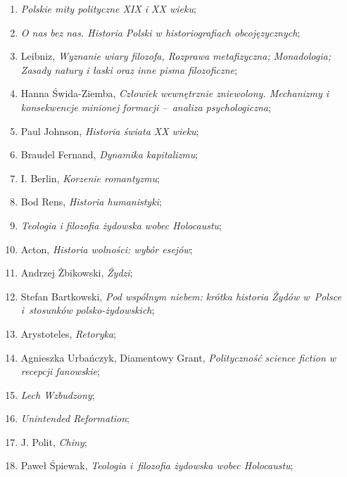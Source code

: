 \documentclass[a4paper,11pt]{article}
\begin{document}
\begin{enumerate}
\item \textit{Polskie mity polityczne XIX i XX wieku};

\item \textit{O nas bez nas. Historia Polski w historiografiach
    obcojęzycznych};

\item Leibniz, \textit{Wyznanie wiary filozofa, Rozprawa metafizyczna;
    Monadologia; Zasady natury i łaski oraz inne pisma filozoficzne};

\item Hanna Świda-Ziemba, \textit{Człowiek wewnętrznie zniewolony.
    Mechanizmy i konsekwencje minionej formacji --~analiza
    psychologiczna};

\item Paul Johnson, \textit{Historia świata XX wieku};

\item Braudel Fernand, \textit{Dynamika kapitalizmu};

\item I. Berlin, \textit{Korzenie romantyzmu};

\item Bod Rens, \textit{Historia humanistyki};

\item \textit{Teologia i filozofia żydowska wobec Holocaustu};

\item Acton, \textit{Historia wolności: wybór esejów};

\item Andrzej Żbikowski, \textit{Żydzi};

\item Stefan Bartkowski, \textit{Pod wspólnym niebem: krótka historia
    Żydów w~Polsce i~stosunków polsko-żydowskich};

\item Arystoteles, \textit{Retoryka};

\item Agnieszka Urbańczyk, Diamentowy Grant, \textit{Polityczność
    science fiction w recepcji fanowskie};

\item \textit{Lech Wzbudzony};

\item \textit{Unintended Reformation};

\item J. Polit, \textit{Chiny};

\item Paweł Śpiewak, \textit{Teologia i~filozofia żydowska wobec
    Holocaustu};


\end{enumerate}
\end{document}
